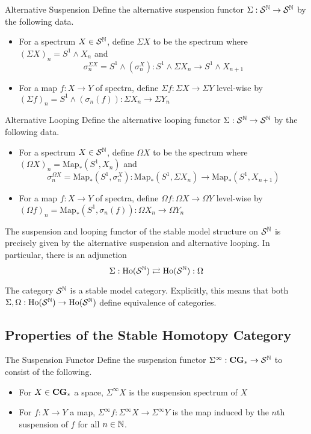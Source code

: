\documentclass[a4paper]{article}
\begin{document}
\begin{defn}{Alternative Suspension}{} Define the alternative suspension functor $\Sigma:\mathcal{S}^{\mathbb{N}}\to\mathcal{S}^{\mathbb{N}}$ by the following data. 
\begin{itemize}
\item For a spectrum $X\in\mathcal{S}^{\mathbb{N}}$, define $\Sigma X$ to be the spectrum where $(\Sigma X)_n=S^1\wedge X_n$ and $$\sigma_n^{\Sigma X}=S^1\wedge(\sigma_n^X):S^1\wedge\Sigma X_n\to S^1\wedge X_{n+1}$$
\item For a map $f:X\to Y$ of spectra, define $\Sigma f:\Sigma X\to\Sigma Y$ level-wise by $(\Sigma f)_n=S^1\wedge(\sigma_n(f)):\Sigma X_n\to\Sigma Y_n$
\end{itemize}
\end{defn}

\begin{defn}{Alternative Looping}{} Define the alternative looping functor $\Sigma:\mathcal{S}^{\mathbb{N}}\to\mathcal{S}^{\mathbb{N}}$ by the following data. 
\begin{itemize}
\item For a spectrum $X\in\mathcal{S}^{\mathbb{N}}$, define $\Omega X$ to be the spectrum where $(\Omega X)_n=\text{Map}_\ast(S^1,X_n)$ and $$\sigma_n^{\Omega X}=\text{Map}_\ast(S^1,\sigma_n^X):\text{Map}_\ast(S^1,\Sigma X_n)\to\text{Map}_\ast(S^1,X_{n+1})$$
\item For a map $f:X\to Y$ of spectra, define $\Omega f:\Omega X\to\Omega Y$ level-wise by $(\Omega f)_n=\text{Map}_\ast(S^1,\sigma_n(f)):\Omega X_n\to\Omega Y_n$
\end{itemize}
\end{defn}

\begin{thm}{}{} The suspension and looping functor of the stable model structure on $\mathcal{S}^{\mathbb{N}}$ is precisely given by the alternative suspension and alternative looping. In particular, there is an adjunction $$\Sigma:\text{Ho}(\mathcal{S}^{\mathbb{N}})\rightleftarrows\text{Ho}(\mathcal{S}^{\mathbb{N}}):\Omega$$
\end{thm}

\begin{thm}{}{} The category $\mathcal{S}^{\mathbb{N}}$ is a stable model category. Explicitly, this means that both $\Sigma,\Omega:\text{Ho}(\mathcal{S}^{\mathbb{N}})\to\text{Ho}(\mathcal{S}^{\mathbb{N}})$ define equivalence of categories. 
\end{thm}

\subsection{Properties of the Stable Homotopy Category}
\begin{defn}{The Suspension Functor}{} Define the suspension functor $\Sigma^\infty:\bold{CG}_\ast\to\mathcal{S}^{\mathbb{N}}$ to consist of the following. 
\begin{itemize}
\item For $X\in\bold{CG}_\ast$ a space, $\Sigma^\infty X$ is the suspension spectrum of $X$
\item For $f:X\to Y$ a map, $\Sigma^\infty f:\Sigma^\infty X\to\Sigma^\infty Y$ is the map induced by the $n$th suspension of $f$ for all $n\in\mathbb{N}$. 
\end{itemize}
\end{defn}
\end{document}

